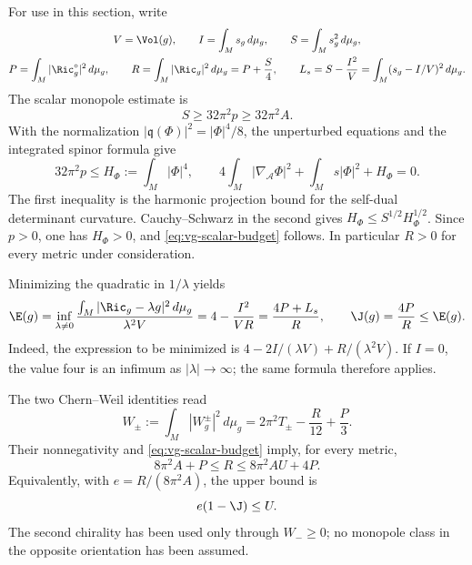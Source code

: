 For use in this section, write
\begin{equation}\label{eq:vg-energies}
 \begin{gathered}
 V=\Vol(g),\qquad I=\int_Ms_g\,d\mu_g,\qquad
 S=\int_Ms_g^2\,d\mu_g,\\
 P=\int_M|\Ric_g^\circ|^2\,d\mu_g,\qquad
 R=\int_M|\Ric_g|^2\,d\mu_g=P+\frac S4,\qquad
 L_s=S-\frac{I^2}{V}=\int_M(s_g-I/V)^2\,d\mu_g.
 \end{gathered}
\end{equation}
The scalar monopole estimate is
\begin{equation}\label{eq:vg-scalar-budget}
 S\geq32\pi^2p\geq32\pi^2A.
\end{equation}
With the normalization $|\mathfrak q(\Phi)|^2=|\Phi|^4/8$, the
unperturbed equations and the integrated spinor formula give
\[
 32\pi^2p\leq H_\Phi:=\int_M|\Phi|^4,
 \qquad
 4\int_M|\nabla_{\mathcal A}\Phi|^2
       +\int_Ms|\Phi|^2+H_\Phi=0.
\]
The first inequality is the harmonic projection bound for the self-dual
determinant curvature.  Cauchy--Schwarz in the second gives
$H_\Phi\leq S^{1/2}H_\Phi^{1/2}$.  Since $p>0$, one has $H_\Phi>0$,
and \eqref{eq:vg-scalar-budget} follows.  In particular $R>0$ for every
metric under consideration.

Minimizing the quadratic in $1/\lambda$ yields
\begin{equation}\label{eq:vg-defect-formulas}
 \E(g)=\inf_{\lambda\ne0}
   \frac{\int_M|\Ric_g-\lambda g|^2\,d\mu_g}{\lambda^2V}
   =4-\frac{I^2}{VR}
   =\frac{4P+L_s}{R},\qquad
 \J(g)=\frac{4P}{R}\leq\E(g).
\end{equation}
Indeed, the expression to be minimized is
$4-2I/(\lambda V)+R/(\lambda^2V)$.  If $I=0$, the value four is
an infimum as $|\lambda|\to\infty$; the same formula therefore applies.

The two Chern--Weil identities read
\begin{equation}\label{eq:vg-chiral-identities}
 W_\pm:=\int_M|W_g^\pm|^2\,d\mu_g
       =2\pi^2T_\pm-\frac{R}{12}+\frac P3.
\end{equation}
Their nonnegativity and \eqref{eq:vg-scalar-budget} imply, for every metric,
\begin{equation}\label{eq:vg-two-sided-R}
 8\pi^2A+P\leq R\leq8\pi^2AU+4P.
\end{equation}
Equivalently, with $e=R/(8\pi^2A)$, the upper bound is
\begin{equation}\label{eq:vg-topological-ceiling}
 e(1-\J)\leq U.
\end{equation}
The second chirality has been used only through $W_-\geq0$; no monopole
class in the opposite orientation has been assumed.

